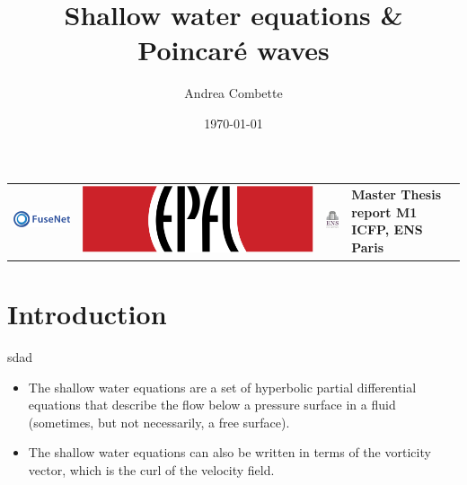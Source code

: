 \documentclass[numbering=fraction]{beamer}
\title{Shallow water equations \& Poincaré waves}\author{Andrea Combette}
\institute{ENS ULM}
\date{\today{}}
\begin{document}
\begin{frame}
  \begin{tabular}{m{.25\linewidth} m{.25\linewidth}  m{.15\linewidth} m{.2\linewidth}}

    \includegraphics[height=.7cm]{./figures/fusenet.png} & \includegraphics[height=.7cm]{./figures/epfl.png} & \includegraphics[height=2cm]{./figures/ens.png} &
    \raggedleft\small\sffamily\bfseries{Master Thesis report
      M1 ICFP, ENS Paris}
  \end{tabular}  \titlepage
\end{frame}

\section{Introduction}
\begin{frame}{sdad}
  \begin{itemize}
    \item The shallow water equations are a set of hyperbolic partial differential equations that describe the flow below a pressure surface in a fluid (sometimes, but not necessarily, a free surface).
    \item  The shallow water equations can also be written in terms of the vorticity vector, which is the curl of the velocity field.
  \end{itemize}
\end{frame}
\end{document}
